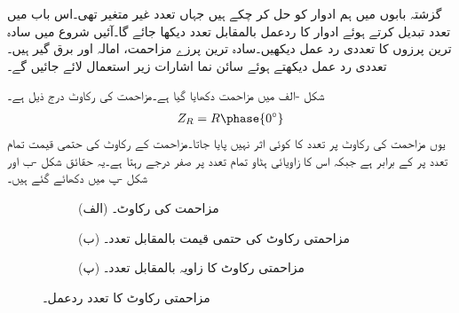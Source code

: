 گزشتہ بابوں میں ہم  ادوار کو حل کر چکے ہیں جہاں تعدد غیر متغیر تھی۔اس باب میں تعدد تبدیل کرتے ہوئے ادوار کا ردعمل بالمقابل تعدد دیکھا جائے گا۔آئیں شروع میں سادہ ترین پرزوں کا تعددی رد عمل دیکھیں۔سادہ ترین پرزے  مزاحمت، امالہ اور برق گیر ہیں۔تعددی رد عمل دیکھتے ہوئے سائن نما اشارات زیر استعمال لائے جائیں گے۔ 

شکل -الف میں مزاحمت دکھایا گیا ہے۔مزاحمت کی رکاوٹ درج ذیل ہے۔
\begin{align}
Z_R=R\phase{0^{\circ}}
\end{align}
یوں مزاحمت کی رکاوٹ پر تعدد  کا کوئی اثر نہیں پایا جاتا۔مزاحمت کے رکاوٹ کی حتمی قیمت  تمام تعدد پر  کے برابر ہے جبکہ اس کا زاویائی ہٹاو  تمام تعدد پر صفر درجے رہتا ہے۔یہ حقائق شکل -ب اور شکل -پ میں دکھائے گئے ہیں۔
\begin{figure}
\centering
\begin{subfigure}{1\textwidth}
\centering
{}
\caption*{(الف) مزاحمت کی رکاوٹ۔}
\end{subfigure}
\begin{subfigure}{0.5\textwidth}
\centering
{}%
\caption*{(ب) مزاحمتی رکاوٹ کی حتمی قیمت بالمقابل تعدد۔}
\end{subfigure}%
\begin{subfigure}{0.5\textwidth}
\centering
{}%
\caption*{(پ) مزاحمتی رکاوٹ کا زاویہ بالمقابل تعدد۔}
\end{subfigure}%
\caption{مزاحمتی رکاوٹ کا تعدد ردعمل۔}
\label{شکل_تعددی_مزاحمتی_ردعمل}
\end{figure}

